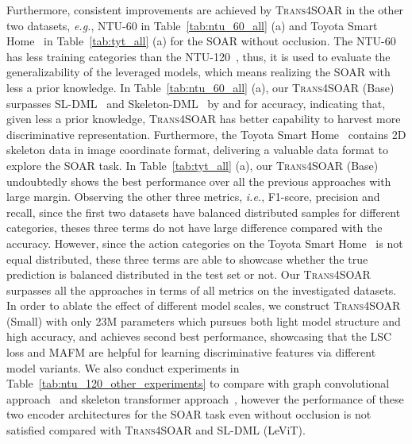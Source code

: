 \documentclass[lettersize,journal]{IEEEtran}
\begin{document}
Furthermore, consistent improvements are achieved by \textsc{Trans4SOAR} in the other two datasets, \textit{e.g.}, NTU-60 in Table~\ref{tab:ntu_60_all} (a) and Toyota Smart Home~\cite{Das_2019_ICCV} in Table~\ref{tab:tyt_all} (a) for the SOAR without occlusion.
The NTU-60~\cite{shahroudy2016ntu} has less training categories than the NTU-120~\cite{liu2019ntu}, thus, it is used to evaluate the generalizability of the leveraged models, which means realizing the SOAR with less a prior knowledge.
In Table~\ref{tab:ntu_60_all} (a), our \textsc{Trans4SOAR} (Base) surpasses SL-DML~\cite{memmesheimer2021sl} and Skeleton-DML~\cite{memmesheimer2020skeleton_dml} by  and  for accuracy, indicating that, given less a prior knowledge, \textsc{Trans4SOAR} has better capability to harvest more discriminative representation. 
Furthermore, the Toyota Smart Home~\cite{Das_2019_ICCV} contains 2D skeleton data in image coordinate format, delivering a valuable data format to explore the SOAR task.
In Table~\ref{tab:tyt_all} (a), our \textsc{Trans4SOAR} (Base) undoubtedly shows the best performance over all the previous approaches with large margin.
Observing the other three metrics, \textit{i.e.}, F1-score, precision and recall, since the first two datasets have balanced distributed samples for different categories, theses three terms do not have large difference compared with the accuracy. However, since the action categories on the Toyota Smart Home~\cite{Das_2019_ICCV} is not equal distributed, these three terms are able to showcase whether the true prediction is balanced distributed in the test set or not.
Our \textsc{Trans4SOAR} surpasses all the approaches in terms of all metrics on the investigated datasets.
In order to ablate the effect of different model scales, we construct \textsc{Trans4SOAR} (Small) with only 23M parameters which pursues both light model structure and high accuracy, and achieves second best performance, showcasing that the LSC loss and MAFM are helpful for learning discriminative features via different model variants.
We also conduct experiments in Table~\ref{tab:ntu_120_other_experiments} to compare with graph convolutional approach~\cite{chen2021channel} and skeleton transformer approach~\cite{plizzari2021skeleton}, however the performance of these two encoder architectures for the SOAR task even without occlusion is not satisfied compared with \textsc{Trans4SOAR} and SL-DML (LeViT). 
\end{document}
